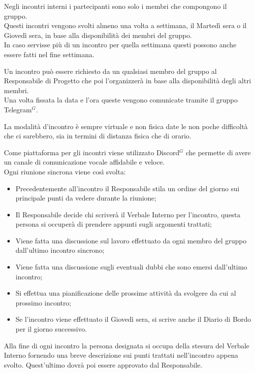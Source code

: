             Negli incontri interni i partecipanti sono solo i membri che compongono il gruppo. \\
            Questi incontri vengono svolti almeno una volta a settimana, il Martedì sera o il Giovedì sera, in base alla disponibilità dei membri del gruppo. \\
            In caso servisse più di un incontro per quella settimana questi possono anche essere fatti nel fine settimana. 

            Un incontro può essere richiesto da un qualsiasi membro del gruppo al Responsabile di Progetto che poi l'organizzerà in base alla disponibilità degli altri membri. \\
            Una volta fissata la data e l'ora queste vengono comunicate tramite il gruppo Telegram$^{G}$.

            La modalità d'incontro è sempre virtuale e non fisica date le non poche difficoltà che ci sarebbero, sia in termini di distanza fisica che di orario. 

            Come piattaforma per gli incontri viene utilizzato Discord$^{G}$ che permette di avere un canale di comunicazione vocale affidabile e veloce.\\

            Ogni riunione sincrona viene così svolta:
            \begin{itemize}
                \item Precedentemente all'incontro il Responsabile stila un ordine del giorno sui principale punti da vedere durante la riunione;
                \item Il Responsabile decide chi scriverà il Verbale Interno per l'incontro, questa persona si occuperà di prendere appunti sugli argomenti trattati;
                \item Viene fatta una discussione sul lavoro effettuato da ogni membro del gruppo dall'ultimo incontro sincrono;
                \item Viene fatta una discussione sugli eventuali dubbi che sono emersi dall'ultimo incontro;
                \item Si effettua una pianificazione delle prossime attività da svolgere da cui al prossimo incontro;
                \item Se l'incontro viene effettuato il Giovedì sera, si scrive anche il Diario di Bordo per il giorno successivo.
            \end{itemize}

            Alla fine di ogni incontro la persona designata si occupa della stesura del Verbale Interno fornendo una breve descrizione sui punti trattati nell'incontro appena svolto.
            Quest'ultimo dovrà poi essere approvato dal Responsabile.
               

